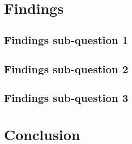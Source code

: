 \documentclass[man,floatsintext]{apa7}
\begin{document}
\newpage

\section{Findings}

\subsection{Findings sub-question 1}


\newpage

\subsection{Findings sub-question 2}

\newpage

\subsection{Findings sub-question 3}

\newpage

\pagebreak
\section{Conclusion}

\clearpage


\newpage

\printbibliography
\end{document}
